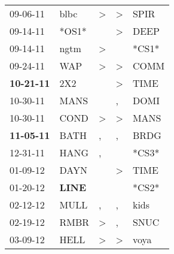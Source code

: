 \begin{supertabular}{p{0.07\textwidth}p{0.06\textwidth}p{0.02\textwidth}p{0.02\textwidth}p{0.06\textwidth}}
          09-06-11\textsuperscript{} &           blbc\textsuperscript{} &     \textgreater &     \textgreater &           SPIR\textsuperscript{} \\
          09-14-11\textsuperscript{} &                            *OS1* &                  &     \textgreater &           DEEP\textsuperscript{} \\
          09-14-11\textsuperscript{} &           ngtm\textsuperscript{} &     \textgreater &                  &                            *CS1* \\
          09-24-11\textsuperscript{} &            WAP\textsuperscript{} &     \textgreater &     \textgreater &           COMM\textsuperscript{} \\
 \textbf{10-21-11\textsuperscript{}} &            2X2\textsuperscript{} &                  &     \textgreater &           TIME\textsuperscript{} \\
          10-30-11\textsuperscript{} &           MANS\textsuperscript{} &                  &                , &           DOMI\textsuperscript{} \\
          10-30-11\textsuperscript{} &           COND\textsuperscript{} &     \textgreater &     \textgreater &           MANS\textsuperscript{} \\
 \textbf{11-05-11\textsuperscript{}} &           BATH\textsuperscript{} &                , &                , &           BRDG\textsuperscript{} \\
          12-31-11\textsuperscript{} &           HANG\textsuperscript{} &                , &                  &                            *CS3* \\
          01-09-12\textsuperscript{} &           DAYN\textsuperscript{} &                  &     \textgreater &           TIME\textsuperscript{} \\
          01-20-12\textsuperscript{} &  \textbf{LINE\textsuperscript{}} &                  &                  &                            *CS2* \\
          02-12-12\textsuperscript{} &           MULL\textsuperscript{} &                , &                , &           kids\textsuperscript{} \\
          02-19-12\textsuperscript{} &           RMBR\textsuperscript{} &     \textgreater &                , &           SNUC\textsuperscript{} \\
          03-09-12\textsuperscript{} &           HELL\textsuperscript{} &     \textgreater &     \textgreater &           voya\textsuperscript{} \\

\end{supertabular}
